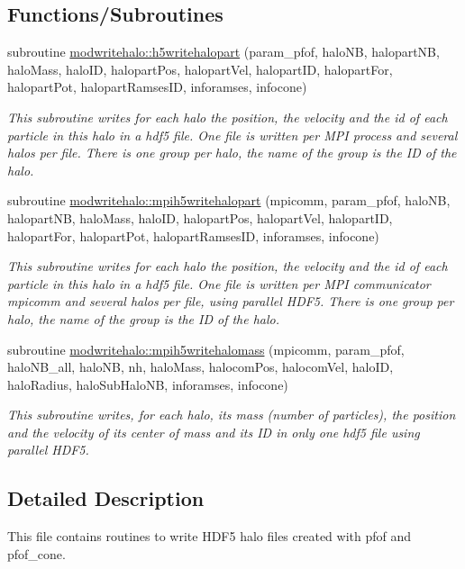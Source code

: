 \subsection*{Functions/\+Subroutines}
\begin{DoxyCompactItemize}
\item 
subroutine \hyperlink{namespacemodwritehalo_a3e00317bab6230ca8987e14b62b79874}{modwritehalo\+::h5writehalopart} (param\+\_\+pfof, halo\+NB, halopart\+NB, halo\+Mass, halo\+ID, halopart\+Pos, halopart\+Vel, halopart\+ID, halopart\+For, halopart\+Pot, halopart\+Ramses\+ID, inforamses, infocone)
\begin{DoxyCompactList}\small\item\em This subroutine writes for each halo the position, the velocity and the id of each particle in this halo in a hdf5 file. One file is written per M\+PI process and several halos per file. There is one group per halo, the name of the group is the ID of the halo. \end{DoxyCompactList}\item 
subroutine \hyperlink{namespacemodwritehalo_a7de4785bb81feb8a4b806bd18a65bf4d}{modwritehalo\+::mpih5writehalopart} (mpicomm, param\+\_\+pfof, halo\+NB, halopart\+NB, halo\+Mass, halo\+ID, halopart\+Pos, halopart\+Vel, halopart\+ID, halopart\+For, halopart\+Pot, halopart\+Ramses\+ID, inforamses, infocone)
\begin{DoxyCompactList}\small\item\em This subroutine writes for each halo the position, the velocity and the id of each particle in this halo in a hdf5 file. One file is written per M\+PI communicator mpicomm and several halos per file, using parallel H\+D\+F5. There is one group per halo, the name of the group is the ID of the halo. \end{DoxyCompactList}\item 
subroutine \hyperlink{namespacemodwritehalo_a9f9dfc9671a5f395219212ba8d45204b}{modwritehalo\+::mpih5writehalomass} (mpicomm, param\+\_\+pfof, halo\+N\+B\+\_\+all, halo\+NB, nh, halo\+Mass, halocom\+Pos, halocom\+Vel, halo\+ID, halo\+Radius, halo\+Sub\+Halo\+NB, inforamses, infocone)
\begin{DoxyCompactList}\small\item\em This subroutine writes, for each halo, its mass (number of particles), the position and the velocity of its center of mass and its ID in only one hdf5 file using parallel H\+D\+F5. \end{DoxyCompactList}\end{DoxyCompactItemize}


\subsection{Detailed Description}
This file contains routines to write H\+D\+F5 halo files created with pfof and pfof\+\_\+cone. 

